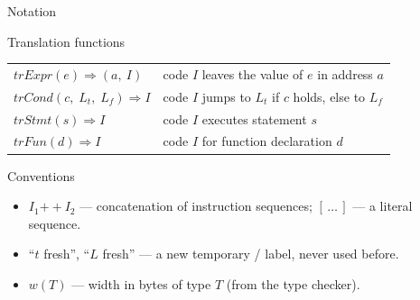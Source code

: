 \documentclass[aspectratio=169]{beamer}
\newcommand{\trExpr}[1]{\mathit{trExpr}(#1)}
\newcommand{\trStmt}[1]{\mathit{trStmt}(#1)}
\newcommand{\trFun}[1]{\mathit{trFun}(#1)}
\newcommand{\trCond}[3]{\mathit{trCond}(#1,\;#2,\;#3)}
\newcommand{\cat}{\mathbin{+\!\!+}}
\begin{document}
\begin{frame}{Notation}
  \begin{block}{Translation functions}
    \begin{tabular}{ll}
      $\trExpr{e} \Rightarrow (a,\ I)$     & code $I$ leaves the value of $e$ in address $a$ \\[0.2em]
      $\trCond{c}{L_t}{L_f} \Rightarrow I$ & code $I$ jumps to $L_t$ if $c$ holds, else to $L_f$ \\[0.2em]
      $\trStmt{s} \Rightarrow I$           & code $I$ executes statement $s$ \\[0.2em]
      $\trFun{d} \Rightarrow I$            & code $I$ for function declaration $d$
    \end{tabular}
  \end{block}
  \vspace{0.3em}
  \begin{block}{Conventions}
    \begin{itemize}
      \item $I_1 \cat I_2$ — concatenation of instruction sequences; $[\,\ldots\,]$ — a literal sequence.
      \item ``$t$ fresh'', ``$L$ fresh'' — a new temporary / label, never used before.
      \item $w(T)$ — width in bytes of type $T$ (from the type checker).
    \end{itemize}
  \end{block}
\end{frame}
\end{document}
